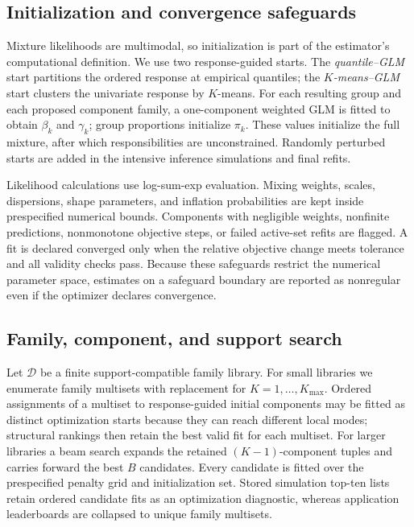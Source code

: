 \documentclass[a4paper,fleqn]{cas-sc}
\newcommand{\D}{\mathcal D}
\begin{document}
\subsection{Initialization and convergence safeguards}
\label{sec:init}

Mixture likelihoods are multimodal, so initialization is part of the estimator's computational definition. We use two response-guided starts. The \emph{quantile--GLM} start partitions the ordered response at empirical quantiles; the \emph{$K$-means--GLM} start clusters the univariate response by $K$-means. For each resulting group and each proposed component family, a one-component weighted GLM is fitted to obtain $\beta_k$ and $\gamma_k$; group proportions initialize $\pi_k$. These values initialize the full mixture, after which responsibilities are unconstrained. Randomly perturbed starts are added in the intensive inference simulations and final refits.

Likelihood calculations use log-sum-exp evaluation. Mixing weights, scales, dispersions, shape parameters, and inflation probabilities are kept inside prespecified numerical bounds. Components with negligible weights, nonfinite predictions, nonmonotone objective steps, or failed active-set refits are flagged. A fit is declared converged only when the relative objective change meets tolerance and all validity checks pass. Because these safeguards restrict the numerical parameter space, estimates on a safeguard boundary are reported as nonregular even if the optimizer declares convergence.

\subsection{Family, component, and support search}
\label{sec:search}

Let $\D$ be a finite support-compatible family library. For small libraries we enumerate family multisets with replacement for $K=1,\ldots,K_{\max}$. Ordered assignments of a multiset to response-guided initial components may be fitted as distinct optimization starts because they can reach different local modes; structural rankings then retain the best valid fit for each multiset. For larger libraries a beam search expands the retained $(K-1)$-component tuples and carries forward the best $B$ candidates. Every candidate is fitted over the prespecified penalty grid and initialization set. Stored simulation top-ten lists retain ordered candidate fits as an optimization diagnostic, whereas application leaderboards are collapsed to unique family multisets.
\end{document}
